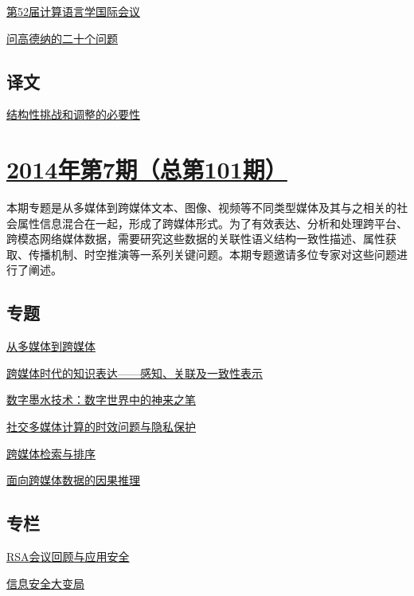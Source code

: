 \documentclass[a4paper]{article}
\begin{document}
\href{http://history.ccf.org.cn/resources/1190201776262/2014/08/13/16.pdf}{第52届计算语言学国际会议}

\href{http://history.ccf.org.cn/resources/1190201776262/2014/08/13/14.pdf}{问高德纳的二十个问题}

\subsection{译文}
\href{http://history.ccf.org.cn/resources/1190201776262/2014/08/13/17.pdf}{结构性挑战和调整的必要性}


\section{\href{http://history.ccf.org.cn/sites/ccf/jsjtbbd.jsp?contentId=2810563245054}{\textbf{2014年第7期（总第101期）}}}
本期专题是从多媒体到跨媒体文本、图像、视频等不同类型媒体及其与之相关的社会属性信息混合在一起，形成了跨媒体形式。为了有效表达、分析和处理跨平台、跨模态网络媒体数据，需要研究这些数据的关联性语义结构一致性描述、属性获取、传播机制、时空推演等一系列关键问题。本期专题邀请多位专家对这些问题进行了阐述。
\subsection{专题}
\href{http://history.ccf.org.cn/resources/1190201776262/2014/07/14/1.pdf}{从多媒体到跨媒体}

\href{http://history.ccf.org.cn/resources/1190201776262/2014/07/14/2.pdf}{跨媒体时代的知识表达——感知、关联及一致性表示}

\href{http://history.ccf.org.cn/resources/1190201776262/2014/07/14/5.pdf}{数字墨水技术：数字世界中的神来之笔}

\href{http://history.ccf.org.cn/resources/1190201776262/2014/07/15/6.pdf}{社交多媒体计算的时效问题与隐私保护}

\href{http://history.ccf.org.cn/resources/1190201776262/2014/07/14/3.pdf}{跨媒体检索与排序}

\href{http://history.ccf.org.cn/resources/1190201776262/2014/07/14/4.pdf}{面向跨媒体数据的因果推理}

\subsection{专栏}
\href{http://history.ccf.org.cn/resources/1190201776262/2014/07/14/10.pdf}{RSA会议回顾与应用安全}

\href{http://history.ccf.org.cn/resources/1190201776262/2014/07/14/11.pdf}{信息安全大变局}
\end{document}
